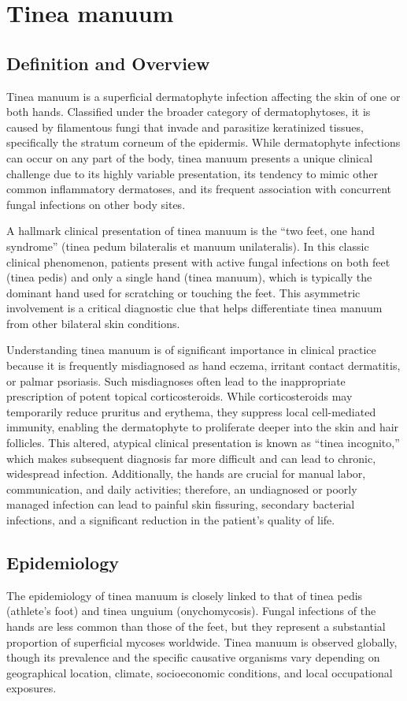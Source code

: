 \chapter{Tinea manuum}

\section*{Definition and Overview}
Tinea manuum is a superficial dermatophyte infection affecting the skin of one or both hands. Classified under the broader category of dermatophytoses, it is caused by filamentous fungi that invade and parasitize keratinized tissues, specifically the stratum corneum of the epidermis. While dermatophyte infections can occur on any part of the body, tinea manuum presents a unique clinical challenge due to its highly variable presentation, its tendency to mimic other common inflammatory dermatoses, and its frequent association with concurrent fungal infections on other body sites.

A hallmark clinical presentation of tinea manuum is the ``two feet, one hand syndrome'' (tinea pedum bilateralis et manuum unilateralis). In this classic clinical phenomenon, patients present with active fungal infections on both feet (tinea pedis) and only a single hand (tinea manuum), which is typically the dominant hand used for scratching or touching the feet. This asymmetric involvement is a critical diagnostic clue that helps differentiate tinea manuum from other bilateral skin conditions.

Understanding tinea manuum is of significant importance in clinical practice because it is frequently misdiagnosed as hand eczema, irritant contact dermatitis, or palmar psoriasis. Such misdiagnoses often lead to the inappropriate prescription of potent topical corticosteroids. While corticosteroids may temporarily reduce pruritus and erythema, they suppress local cell-mediated immunity, enabling the dermatophyte to proliferate deeper into the skin and hair follicles. This altered, atypical clinical presentation is known as ``tinea incognito,'' which makes subsequent diagnosis far more difficult and can lead to chronic, widespread infection. Additionally, the hands are crucial for manual labor, communication, and daily activities; therefore, an undiagnosed or poorly managed infection can lead to painful skin fissuring, secondary bacterial infections, and a significant reduction in the patient's quality of life.

\section*{Epidemiology}
The epidemiology of tinea manuum is closely linked to that of tinea pedis (athlete's foot) and tinea unguium (onychomycosis). Fungal infections of the hands are less common than those of the feet, but they represent a substantial proportion of superficial mycoses worldwide. Tinea manuum is observed globally, though its prevalence and the specific causative organisms vary depending on geographical location, climate, socioeconomic conditions, and local occupational exposures.

